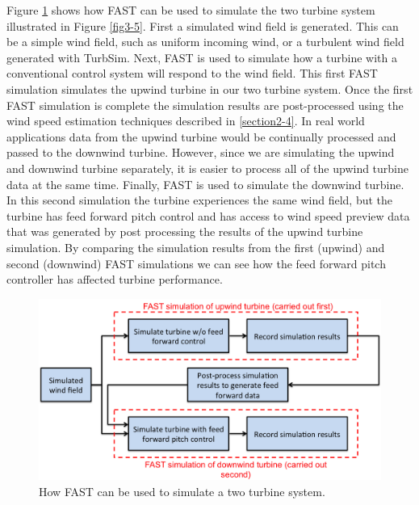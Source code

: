 Figure \ref{fig3-6} shows how FAST can be used to simulate the two turbine system illustrated in Figure \ref{fig3-5}. First a simulated wind field is generated. This can be a simple wind field, such as  uniform incoming wind, or a turbulent wind field generated with TurbSim. Next, FAST is used to simulate how a turbine with a conventional control system will respond to the  wind field. This first FAST simulation simulates the upwind turbine in our two turbine system. Once the first FAST simulation is complete the simulation results are post-processed using the wind speed estimation techniques described in \ref{section2-4}. In real world applications data from the upwind turbine would be continually processed and passed to the downwind turbine. However, since we are simulating the upwind and downwind turbine separately, it is easier to process all of the upwind turbine data at the same time. Finally, FAST is used to simulate the downwind turbine. In this second simulation the turbine experiences the same wind field, but the turbine has feed forward pitch control and has access to wind speed preview data that was generated by post processing the results of the upwind turbine simulation. By comparing the simulation results from the first (upwind) and second (downwind) FAST simulations we can see how the feed forward pitch controller has affected turbine performance.

 \begin{figure}[htbp]
	\centering
		\includegraphics[width=\linewidth]{Figures/ch3Figures/fig3-6.png}
		
	\caption{How FAST can be used to simulate a two turbine system.}
	\label{fig3-6}
\end{figure}



